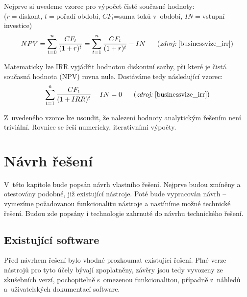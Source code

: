 Nejprve si uvedeme vzorec pro výpočet čisté současné hodnoty: 
\\($r=$diskont, $t=$pořadí období, $CF_t$=suma toků v~období, $IN=$vstupní investice)
$$NPV=\sum\limits_{t=0}^{n} \dfrac{CF_t}{(1+r)^t} = \sum\limits_{t=1}^{n} \dfrac{CF_t}{(1+r)^t} - IN\scite{businessvize_irr}$$

Matematicky lze IRR vyjádřit hodnotou diskontní sazby, při které je čistá současná hodnota (NPV) rovna nule. Dostáváme tedy následující vzorec:
$$\sum\limits_{t=1}^{n} \dfrac{CF_t}{(1+IRR)^t} - IN = 0 \scite{businessvize_irr}$$

Z~uvedeného vzorce lze usoudit, že nalezení hodnoty analytickým řešením není triviální. Rovnice se řeší numericky, iterativními výpočty.








































\chapter{Návrh řešení}
V~této kapitole bude popsán návrh vlastního řešení. Nejprve budou zmíněny a otestovány podobné, již existující nástroje. Poté bude vypracován návrh -- vymezíme požadovanou funkcionalitu nástroje a nastíníme možné technické řešení. Budou zde popsány i technologie zahrnuté do návrhu technického řešení.



\section{Existující software}
Před návrhem řešení bylo vhodné prozkoumat existující řešení. Plné verze nástrojů pro tyto účely bývají zpoplatněny, závěry jsou tedy vyvozeny ze zkušebních verzí, pochopitelně s~omezenou funkcionalitou, případně z~náhledů a~uživatelských dokumentací software.

